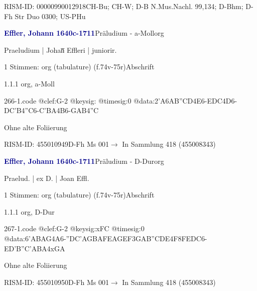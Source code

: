 \documentclass[twocolumn, 12pt]{book}
\begin{document}
\par RISM-ID: 00000990012918\newline CH-Bu; CH-W; D-B  N.Mus.Nachl. 99,134; D-Bhm; D-Fh  Str Duo 0300; US-PHu
\par \vspace{16pt} \textcolor{darkblue}{\textbf{Effler, Johann  1640c-1711}}\hfillplus{\textbf{[266]}}\newline Präludium - a-Moll\newline org
\par \begin{itshape}[f.74v, at left:] Praeludium | Johan̅ Effleri | juniorir.\end{itshape} 
\par \textcolor{darkblue}{}  1 Stimmen: org (tabulature)  (f.74v-75r)\newline Abschrift
\par 1.1.1  org, a-Moll  
\begin{filecontents*}{266-1.code}
@clef:G-2
@keysig:
@timesig:0
@data:2'A{6AB''CD}4E6-{EDC}4D6-{DC'B}4''C6-{C'BA}4B6-{GAB}4''C
\end{filecontents*}
\newline %
\par Ohne alte Foliierung
\par RISM-ID: 455010949\newline D-Fh  Ms 001\newline $\rightarrow$ In Sammlung 418 (455008343)
      
\par \vspace{16pt} \textcolor{darkblue}{\textbf{Effler, Johann  1640c-1711}}\hfillplus{\textbf{[267]}}\newline Präludium - D-Dur\newline org
\par \begin{itshape}[f.75r, at left:] Praelud. | ex D. | Joan Effl.\end{itshape} 
\par \textcolor{darkblue}{}  1 Stimmen: org (tabulature)  (f.74v-75r)\newline Abschrift
\par 1.1.1  org, D-Dur  
\begin{filecontents*}{267-1.code}
@clef:G-2
@keysig:xFC
@timesig:0
@data:{6'ABAG}4A6-{''DC'A}{GBAF}{EAGE}{F3GA}{B''CDE}4F{8FEDC}6-{ED'B}{''C'ABA}4xGA
\end{filecontents*}
\newline %
\par Ohne alte Foliierung
\par RISM-ID: 455010950\newline D-Fh  Ms 001\newline $\rightarrow$ In Sammlung 418 (455008343)
      
\end{document}
